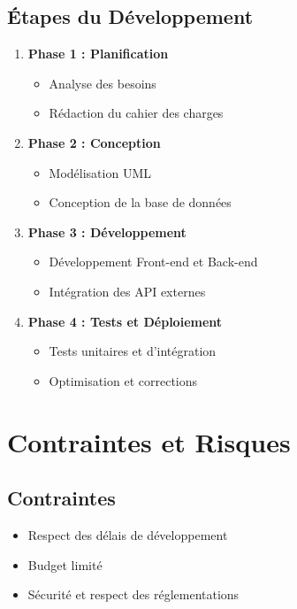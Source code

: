 \documentclass[12pt]{article}
\begin{document}
\subsection{Étapes du Développement}
\begin{enumerate}
    \item \textbf{Phase 1 : Planification}
    \begin{itemize}
        \item Analyse des besoins
        \item Rédaction du cahier des charges
    \end{itemize}
    \item \textbf{Phase 2 : Conception}
    \begin{itemize}
        \item Modélisation UML
        \item Conception de la base de données
    \end{itemize}
    \item \textbf{Phase 3 : Développement}
    \begin{itemize}
        \item Développement Front-end et Back-end
        \item Intégration des API externes
    \end{itemize}
    \item \textbf{Phase 4 : Tests et Déploiement}
    \begin{itemize}
        \item Tests unitaires et d’intégration
        \item Optimisation et corrections
    \end{itemize}
\end{enumerate}

\section{Contraintes et Risques}

\subsection{Contraintes}
\begin{itemize}
    \item Respect des délais de développement
    \item Budget limité
    \item Sécurité et respect des réglementations
\end{itemize}
\end{document}
